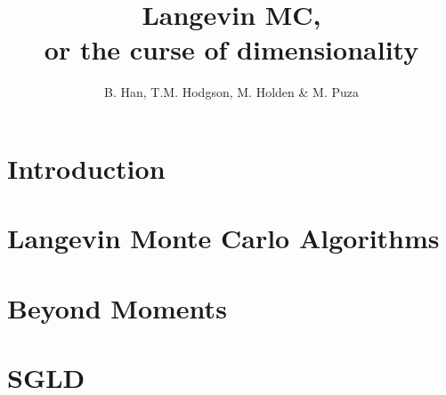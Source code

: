\documentclass[a4paper]{article}
\title{Langevin MC, \\
  \large or the curse of dimensionality}
\author{B. Han, T.M. Hodgson, M. Holden \& M. Puza}
\theoremstyle{definition}
\begin{document}
	\maketitle
	\tableofcontents
	\newpage
	\section{Introduction}
	
	
	\section{Langevin Monte Carlo Algorithms}
	

	\section{Beyond Moments}
	

    \section{SGLD}
    
	
	
\end{document}
